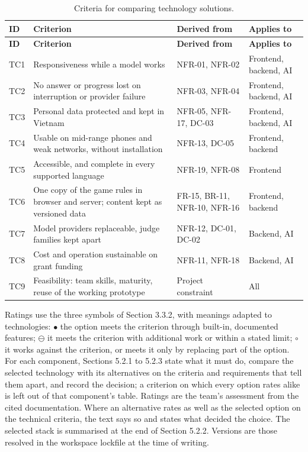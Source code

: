 {\small{}\renewcommand{\arraystretch}{1.1}
\begin{longtable}{|>{\raggedright\arraybackslash}p{}|>{\raggedright\arraybackslash}p{}|>{\raggedright\arraybackslash}p{}|>{\raggedright\arraybackslash}p{}|}
\caption{Criteria for comparing technology solutions.} \\
\hline
\textbf{ID} & \textbf{Criterion} & \textbf{Derived from} & \textbf{Applies to} \\ \hline
\endfirsthead
\hline
\textbf{ID} & \textbf{Criterion} & \textbf{Derived from} & \textbf{Applies to} \\ \hline
\endhead
TC1 & Responsiveness while a model works & NFR-01, NFR-02 & Frontend, backend, AI \\ \hline
TC2 & No answer or progress lost on interruption or provider failure & NFR-03, NFR-04 & Frontend, backend, AI \\ \hline
TC3 & Personal data protected and kept in Vietnam & NFR-05, NFR-17, DC-03 & Frontend, backend, AI \\ \hline
TC4 & Usable on mid-range phones and weak networks, without installation & NFR-13, DC-05 & Frontend, backend \\ \hline
TC5 & Accessible, and complete in every supported language & NFR-19, NFR-08 & Frontend \\ \hline
TC6 & One copy of the game rules in browser and server; content kept as versioned data & FR-15, BR-11, NFR-10, NFR-16 & Frontend, backend \\ \hline
TC7 & Model providers replaceable, judge families kept apart & NFR-12, DC-01, DC-02 & Backend, AI \\ \hline
TC8 & Cost and operation sustainable on grant funding & NFR-11, NFR-18 & Backend, AI \\ \hline
TC9 & Feasibility: team skills, maturity, reuse of the working prototype & Project constraint & All \\ \hline
\end{longtable}
}

Ratings use the three symbols of Section 3.3.2, with meanings adapted to technologies: $\bullet$ the option meets the criterion through built-in, documented features; $\ominus$ it meets the criterion with additional work or within a stated limit; $\circ$ it works against the criterion, or meets it only by replacing part of the option. For each component, Sections 5.2.1 to 5.2.3 state what it must do, compare the selected technology with its alternatives on the criteria and requirements that tell them apart, and record the decision; a criterion on which every option rates alike is left out of that component's table. Ratings are the team's assessment from the cited documentation. Where an alternative rates as well as the selected option on the technical criteria, the text says so and states what decided the choice. The selected stack is summarised at the end of Section 5.2.2. Versions are those resolved in the workspace lockfile at the time of writing.

